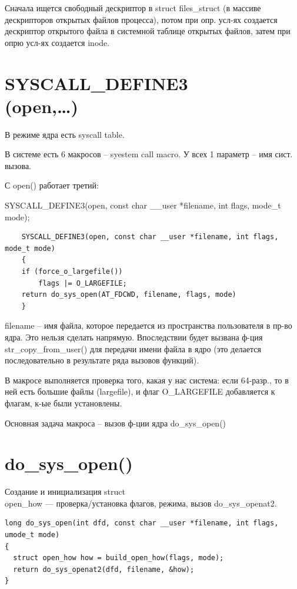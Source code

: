 Сначала ищется свободный дескриптор в struct files\_struct (в массиве дескрипторов открытых файлов процесса), потом при опр. усл-ях создается дескриптор открытого файла в системной таблице открытых файлов, затем при опрю усл-ях создается inode.

\section{SYSCALL\_DEFINE3\\(open,…)}
В режиме ядра есть syscall table.

В системе есть 6 макросов -- syestem call macro. У всех 1 параметр -- имя сист. вызова.

С open() работает третий:

SYSCALL\_DEFINE3(open, const char \_\_user *filename, int flags, mode\_t mode);

\begin{lstlisting}
    SYSCALL_DEFINE3(open, const char __user *filename, int flags, mode_t mode)
    {
    if (force_o_largefile())
        flags |= O_LARGEFILE;
    return do_sys_open(AT_FDCWD, filename, flags, mode)
    }
\end{lstlisting}

filename -- имя файла, которое передается из пространства пользователя в пр-во ядра. Это нельзя сделать напрямую. Впоследствии будет вызвана ф-ция str\_copy\_from\_user() для передачи имени файла в ядро (это делается последовательно в результате ряда вызовов функций).

В макросе выполняется проверка того, какая у нас система: если 64-разр., то в ней есть большие файлы (largefile), и флаг O\_LARGEFILE добавляется к флагам, к-ые были установлены.

Основная задача макроса -- вызов ф-ции ядра do\_sys\_open()

\section{do\_sys\_open()}
Создание и инициализация struct \\ open\_how --- проверка/установка флагов, режима, вызов do\_sys\_openat2.

\begin{lstlisting}
long do_sys_open(int dfd, const char __user *filename, int flags, umode_t mode)
{
  struct open_how how = build_open_how(flags, mode);
  return do_sys_openat2(dfd, filename, &how);
}
\end{lstlisting}

